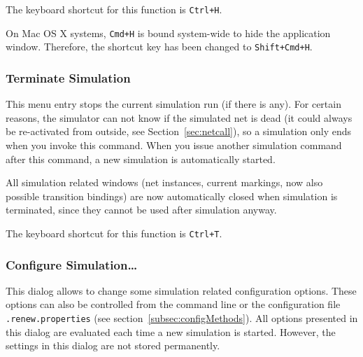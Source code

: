The keyboard shortcut for this function is \texttt{Ctrl+H}.

On Mac OS X systems, \texttt{Cmd+H} is bound system-wide to
hide the application window.  
Therefore, the shortcut key has been changed to \texttt{Shift+Cmd+H}.

\subsubsection{Terminate Simulation}

This menu entry stops the current simulation run (if there is any).
For certain reasons, the simulator can not know if the simulated
net is dead (it could always be re-activated from
outside, see Section~\ref{sec:netcall}), so a simulation only
ends when you invoke this command. When you issue
another simulation command after this command, a new simulation
is automatically started.

All simulation related
windows (net instances, current markings, now also
possible transition bindings) are now automatically closed
when simulation is terminated, since they cannot be used
after simulation anyway.


The keyboard shortcut for this function is \texttt{Ctrl+T}.

\subsubsection{Configure Simulation\dots{}}
\label{subsec:configureSimulation}

This dialog allows to change some simulation
related configuration options.
These options can also be controlled from the command line or
the configuration file \texttt{.renew.properties} (see
section~\ref{subsec:configMethods}).
All options presented in this dialog are evaluated each time a
new simulation is started.
However, the settings in this dialog are not stored
permanently.

